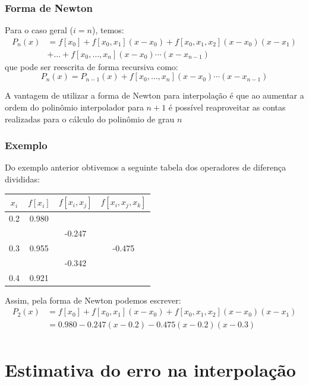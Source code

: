\documentclass{beamer}
\theoremstyle{mystyle}
\begin{document}
\begin{frame}
	\frametitle{Forma de Newton}
	Para o caso geral ($ i=n $), temos:
		\begin{align*}
			P_{n}(x) & =  f[x_{0}] + f[x_{0},x_{1}](x - x_{0}) + f[x_{0},x_{1},x_{2}](x - x_{0})(x - x_{1})\\
					 & +\ldots + f[x_{0},\ldots,x_{n}](x - x_{0})\cdots(x - x_{n-1})
		\end{align*}
		que pode ser reescrita de forma recursiva como:
		\begin{equation*}
			P_{n}(x)  = P_{n-1}(x)+ f[x_{0},\ldots,x_{n}](x - x_{0})\cdots(x - x_{n-1})
		\end{equation*}
	
	A vantagem de utilizar a forma de Newton para interpolação é que ao aumentar a ordem do polinômio interpolador para $ n+1 $ é possível reaproveitar as contas realizadas para o cálculo do polinômio de grau $ n $
\end{frame}

\begin{frame}	
	\frametitle{Exemplo}
	Do exemplo anterior obtivemos a seguinte tabela dos operadores de diferença divididas:
	\begin{table}
		\small 
		\centering
		\begin{tabular}{c|c|c|c}
			$ x_{i} $ & $ f[x_{i}] $ & $ f [x_{i},x_{j}] $ & $ f [x_{i},x_{j},x_{k}] $ \\
			\hline
			\hline
			0.2 & 0.980 & &  \\
			&   & -0.247 & \\
			0.3 & 0.955 & & -0.475 \\
			&   & -0.342  & \\
			0.4 & 0.921 & &  
		\end{tabular}
	\end{table}
	Assim, pela forma de Newton podemos escrever:
	\begin{align*}
		P_{2}(x) &=  f[x_{0}] + f[x_{0},x_{1}](x - x_{0}) + f[x_{0},x_{1},x_{2}](x - x_{0})(x - x_{1})\\
				 &=  0.980 - 0.247(x - 0.2) - 0.475(x - 0.2)(x - 0.3)\\
	\end{align*}
\end{frame}

\section{Estimativa do erro na interpolação}
\end{document}
